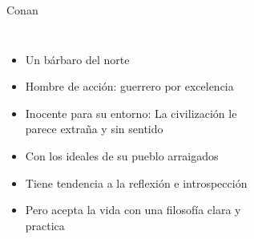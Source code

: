 \begin{frame}{Conan}
	\begin{columns}
		\begin{itemize}
			\item Un bárbaro del norte
			\item Hombre de acción: guerrero por excelencia
			\item Inocente para su entorno: La civilización le parece extraña y sin sentido
			\item Con los ideales de su pueblo arraigados
			\item Tiene tendencia a la reflexión e introspección
			\item Pero acepta la vida con una filosofía clara y practica
		\end{itemize}
		\begin{figure}[htp]
			\centering
			\begin{subfigure}[b]{0.3\textwidth}

\end{subfigure}
\end{figure}
\end{columns}
\end{frame}
